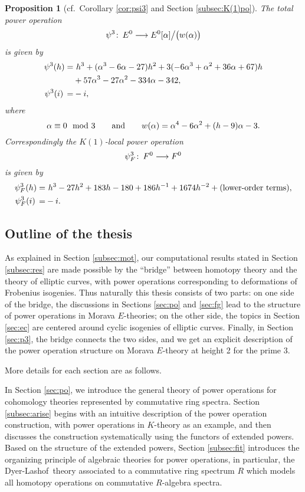 \documentclass{gtpart}
\newtheorem{prop}[thm]{Proposition}
\theoremstyle{definition}
\theoremstyle{remark}
\def\co{\colon\thinspace}
\newcommand{\DL}{Dyer-Lashof~}
\newcommand{\md}{~~{\rm mod}~}
\newcommand{\ad}{{\rm and}}
\newcommand{\A}{\alpha}
\newcommand{\p}{\psi^3}
\numberwithin{equation}{section}
\numberwithin{thm}{section}
\begin{document}
\begin{prop}[cf.~Corollary \ref{cor:psi3} and Section \ref{subsec:K(1)po}]
 The total power operation 
 \[
  \p \co E^0 \longrightarrow E^0 [\A] \big/ \big( w(\A) \big) 
 \]
 is given by 
 \begin{equation*}
 \begin{split}
  \p(h) = & ~ h^3 + (\A^3 - 6 \A - 27) h^2 + 3 (-6 \A^3 + \A^2 + 36 \A + 67) h \\
          & + 57 \A^3 - 27 \A^2 - 334 \A - 342, \\
  \p(i) \thinspace = & -i, 
 \end{split}
 \end{equation*}
 where 
 \[
  \A \equiv 0 \md 3 \qquad \ad \qquad 
  w(\A) = \A^4 - 6 \A^2 + (h - 9) \A - 3.  
 \]
 Correspondingly the $K(1)$-local power operation 
 \[
  \p_F \co F^0 \longrightarrow F^0 
 \]
 is given by 
 \begin{equation*}
 \begin{split}
  \psi_F^3(h) = & ~ h^3 - 27 h^2 + 183 h - 180 + 186 h^{-1} + 1674 h^{-2} + (\text{lower-order terms}), \\
  \psi_F^3(i) \thinspace = & -i.  
 \end{split}
 \end{equation*}
\end{prop}


\subsection{Outline of the thesis}

As explained in Section \ref{subsec:mot}, our computational results 
stated in Section \ref{subsec:res} are made possible by the ``bridge'' 
between homotopy theory and the theory of elliptic curves, with power 
operations corresponding to deformations of Frobenius isogenies.  Thus 
naturally this thesis consists of two parts: on one side of the bridge, 
the discussions in Sections \ref{sec:po} and \ref{sec:fg} lead to the 
structure of power operations in Morava $E$-theories; on the other side, 
the topics in Section \ref{sec:ec} are centered around cyclic isogenies 
of elliptic curves.  Finally, in Section \ref{sec:p3}, the bridge 
connects the two sides, and we get an explicit description of the power 
operation structure on Morava $E$-theory at height 2 for the prime 3.  

More details for each section are as follows.  

In Section \ref{sec:po}, we introduce the general theory of power 
operations for cohomology theories represented by commutative ring 
spectra.  Section \ref{subsec:arise} begins with an intuitive 
description of the power operation construction, with power operations 
in $K$-theory as an example, and then discusses the construction 
systematically using the functors of extended powers.  Based on the 
structure of the extended powers, Section \ref{subsec:fit} introduces 
the organizing principle of algebraic theories for power operations, in 
particular, the \DL theory associated to a commutative ring spectrum $R$ 
which models all homotopy operations on commutative $R$-algebra spectra.  
\end{document}

